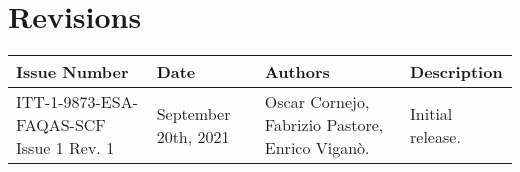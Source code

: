 
\section*{Revisions}
\label{sec:revisions}

\setlength\LTleft{0pt}
\setlength\LTright{0pt}
\scriptsize 
\begin{longtable}{|p{2cm}|p{2cm}|p{2cm}|p{7cm}|@{}}
\label{table:codeoperators} \\
\hline
\textbf{Issue Number}&\textbf{Date}&\textbf{Authors}&\textbf{Description}\\
\hline
ITT-1-9873-ESA-FAQAS-SCF
Issue 1 Rev. 1&
September 20th, 2021&
Oscar Cornejo, Fabrizio Pastore, Enrico Viganò.&
\begin{minipage}{8cm}
Initial release.
\end{minipage}
\\
\hline



                                                    
\end{longtable}
\normalsize

\clearpage